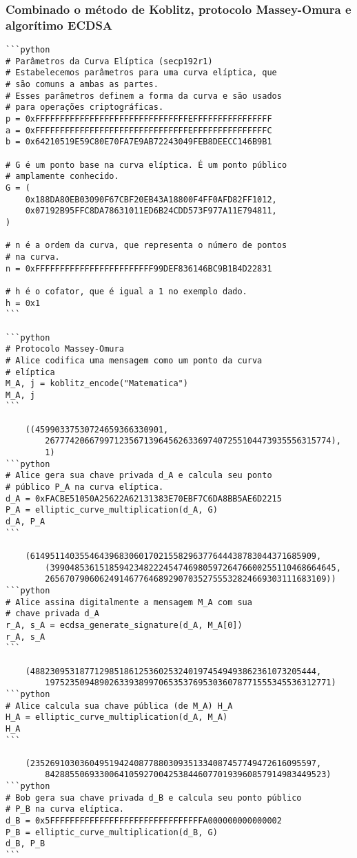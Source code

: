 \subsubsection{Combinado o método de Koblitz, protocolo  Massey-Omura e algorítimo ECDSA} \label{subsubsection:89ad3e15-6b36-468a-ace8-61af2b04b09e}
\begin{verbatim}
```python
# Parâmetros da Curva Elíptica (secp192r1)
# Estabelecemos parâmetros para uma curva elíptica, que
# são comuns a ambas as partes.
# Esses parâmetros definem a forma da curva e são usados
# para operações criptográficas.
p = 0xFFFFFFFFFFFFFFFFFFFFFFFFFFFFFFFEFFFFFFFFFFFFFFFF
a = 0xFFFFFFFFFFFFFFFFFFFFFFFFFFFFFFFEFFFFFFFFFFFFFFFC
b = 0x64210519E59C80E70FA7E9AB72243049FEB8DEECC146B9B1

# G é um ponto base na curva elíptica. É um ponto público
# amplamente conhecido.
G = (
	0x188DA80EB03090F67CBF20EB43A18800F4FF0AFD82FF1012,
	0x07192B95FFC8DA78631011ED6B24CDD573F977A11E794811,
)

# n é a ordem da curva, que representa o número de pontos
# na curva.
n = 0xFFFFFFFFFFFFFFFFFFFFFFFF99DEF836146BC9B1B4D22831

# h é o cofator, que é igual a 1 no exemplo dado.
h = 0x1
```

```python
# Protocolo Massey-Omura
# Alice codifica uma mensagem como um ponto da curva
# elíptica
M_A, j = koblitz_encode("Matematica")
M_A, j
```

	((45990337530724659366330901,
		2677742066799712356713964562633697407255104473935556315774),
		1)
```python
# Alice gera sua chave privada d_A e calcula seu ponto
# público P_A na curva elíptica.
d_A = 0xFACBE51050A25622A62131383E70EBF7C6DA8BB5AE6D2215
P_A = elliptic_curve_multiplication(d_A, G)
d_A, P_A
```

	(6149511403554643968306017021558296377644438783044371685909,
		(3990485361518594234822245474698059726476600255110468664645,
		265670790606249146776468929070352755532824669303111683109))
```python
# Alice assina digitalmente a mensagem M_A com sua
# chave privada d_A
r_A, s_A = ecdsa_generate_signature(d_A, M_A[0])
r_A, s_A
```

	(4882309531877129851861253602532401974549493862361073205444,
		1975235094890263393899706535376953036078771555345536312771)
```python
# Alice calcula sua chave pública (de M_A) H_A
H_A = elliptic_curve_multiplication(d_A, M_A)
H_A
```

	(2352691030360495194240877880309351334087457749472616095597,
		842885506933006410592700425384460770193960857914983449523)
```python
# Bob gera sua chave privada d_B e calcula seu ponto público
# P_B na curva elíptica.
d_B = 0x5FFFFFFFFFFFFFFFFFFFFFFFFFFFFFFFA000000000000002
P_B = elliptic_curve_multiplication(d_B, G)
d_B, P_B
```


\end{verbatim}
